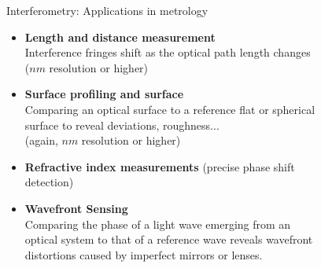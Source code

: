 \documentclass{beamer}
\begin{document}
\begin{frame}{Interferometry: Applications in metrology}
    \begin{itemize}
        \item \textbf{Length and distance measurement}  \\
        \quad Interference fringes shift as the optical path length changes \\  
        \quad ($nm$ resolution or higher)
        \vspace{0.3em}
        \item \textbf{Surface profiling and surface} \\ 
        \quad Comparing an optical surface to a reference flat or spherical \\
        \quad surface to reveal deviations, roughness... \\ 
        \quad (again, $nm$ resolution or higher)
        \vspace{0.3em}
        \item \textbf{Refractive index measurements} (precise phase shift \\
        \quad detection)
        \vspace{0.3em}
        \item \textbf{Wavefront Sensing} \\
        \quad Comparing the phase of a light wave emerging from an \\
        \quad optical system to that of a reference wave reveals wavefront \\
        \quad distortions caused by imperfect mirrors or lenses. 
    \end{itemize}
\end{frame}
\end{document}
